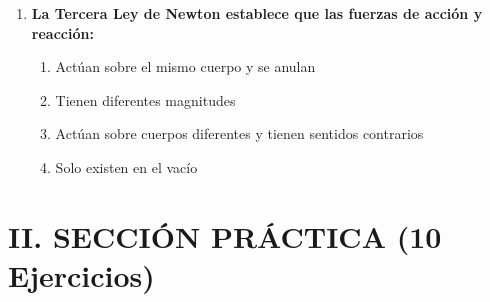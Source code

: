 \documentclass[12pt]{article}
\begin{document}
\begin{enumerate}[label=\arabic*.]
    \item \textbf{La Tercera Ley de Newton establece que las fuerzas de acción y reacción:}
    \begin{enumerate}[label=\alph*)]
        \item Actúan sobre el mismo cuerpo y se anulan
        \item Tienen diferentes magnitudes
        \item Actúan sobre cuerpos diferentes y tienen sentidos contrarios
        \item Solo existen en el vacío
    \end{enumerate}
\end{enumerate}

\newpage
\section*{II. SECCIÓN PRÁCTICA (10 Ejercicios)}
\end{document}
